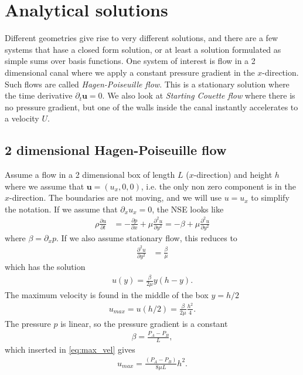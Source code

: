 \documentclass[a4paper,10pt]{article}
\renewcommand{\vec}[1]{\mathbf{#1}}
\renewcommand{\(}{\left(}
\renewcommand{\)}{\right)}
\newcommand{\dpart}[2]{\frac{\partial#1}{\partial#2}}
\newcommand{\dpartt}[2]{\frac{\partial^2#1}{\partial#2^2}}
\begin{document}
\section{Analytical solutions}
Different geometries give rise to very different solutions, and there are a few systems that hase a closed form solution, or at least a solution formulated as simple sums over basis functions. One system of interest is flow in a 2 dimensional canal where we apply a constant pressure gradient in the $x$-direction. Such flows are called \textit{Hagen-Poiseuille flow}. This is a stationary solution where the time derivative $\partial_t \vec u=0$. We also look at \textit{Starting Couette flow} where there is no pressure gradient, but one of the walls inside the canal instantly accelerates to a velocity $U$.

\subsection{2 dimensional Hagen-Poiseuille flow}
Assume a flow in a 2 dimensional box of length $L$ ($x$-direction) and height $h$ where we assume that $\vec u = (u_x,0,0)$, i.e. the only non zero component is in the $x$-direction. The boundaries are not moving, and we will use $u=u_x$ to simplify the notation. If we assume that $\partial_x u_x=0$, the NSE looks like
\begin{align*}
  \rho\dpart{u}{t} &= -\dpart{p}{x} + \mu\dpartt{u}{y} = -\beta + \mu\dpartt{u}{y}
\end{align*}
where $\beta = \partial_x p$. If we also assume stationary flow, this reduces to
\begin{align*}
  \dpartt{u}{y} &= \frac{\beta}{\mu}
\end{align*}
which has the solution
\begin{align*}
  u(y) = \frac{\beta}{2\mu}y(h-y).
\end{align*}
The maximum velocity is found in the middle of the box $y=h/2$
\begin{align}
  \label{eq:max_vel}
  u_{max} = u(h/2) = \frac{\beta}{2\mu}\frac{h^2}{4}.
\end{align}
The pressure $p$ is linear, so the pressure gradient is a constant
\begin{align*}
  \beta = \frac{P_A-P_B}{L},
\end{align*}
which inserted in \eqref{eq:max_vel} gives
\begin{align}
  \label{eq:poiseuille_stationary}
  u_{max} = \frac{(P_A-P_B)}{8\mu L}h^2.
\end{align}
\end{document}
